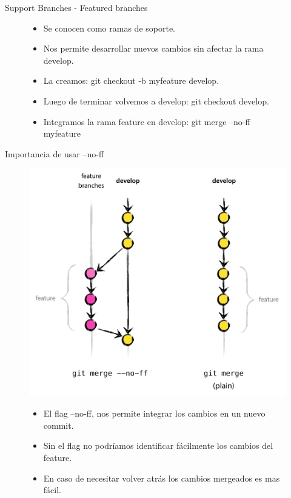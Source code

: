 \documentclass{beamer}
\begin{document}
\begin{frame}{Support Branches - Featured branches}
\begin{figure}
\begin{minipage}{0.3\textwidth}
	\end{minipage}
\begin{minipage}{0.6\textwidth}\raggedright
\begin{itemize}
  \item Se conocen como ramas de soporte.
  \item Nos permite desarrollar nuevos cambios sin afectar la rama develop.
  \item La creamos: git checkout -b myfeature develop.
  \item Luego de terminar volvemos a develop: git checkout develop.
  \item Integramos la rama feature en develop:  git merge --no-ff myfeature
\end{itemize}
\end{minipage}
\end{figure}
\end{frame}

\begin{frame}{Importancia de usar --no-ff}
\begin{figure}
	\begin{minipage}{0.35\textwidth}
		\includegraphics[scale=0.15,left]{merge-without-ff.png}
	\end{minipage}
\begin{minipage}{0.6\textwidth}\raggedright
\begin{itemize}
  \item El flag --no-ff, nos permite integrar los cambios en un nuevo commit.
  \item Sin el flag no podríamos identificar fácilmente los cambios del feature.
  \item En caso de necesitar volver atrás los cambios mergeados es mas fácil.
\end{itemize}
\end{minipage}
\end{figure}
\end{frame}
\end{document}
